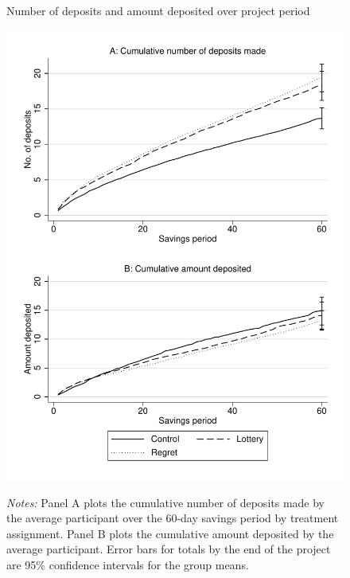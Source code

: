 \documentclass[11pt]{article}
\begin{document}
		\begin{figure}[h]
			\caption{Number of deposits and amount deposited over project period}
			\includegraphics[height=0.85\textheight]{../../figures/line-cumdeposits.pdf}
			\label{fig:line-cumdeposits}
			\caption*{\footnotesize \emph{Notes:} Panel A plots the cumulative number of deposits made by the average participant over the 60-day savings period by treatment assignment. Panel B plots the cumulative amount deposited by the average participant. Error bars for totals by the end of the project are 95\% confidence intervals for the group means.}
		\end{figure}

		
		
		
		


\end{document}
